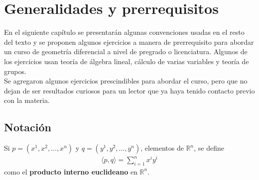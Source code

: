 \documentclass[oneside,11pt]{memoir}
\begin{document}
\chapter*{Generalidades y prerrequisitos}

En el siguiente capítulo se presentarán algunas convenciones usadas en el resto del texto y se proponen algunos ejercicios a manera de prerrequisito para abordar un curso de geometría diferencial a nivel de pregrado o licenciatura. Algunos de los ejercicios usan teoría de álgebra lineal, cálculo de varias variables y teoría de grupos.
\\
Se agregaron algunos ejercicios prescindibles para abordar el curso, pero que no dejan de ser resultados curiosos para un lector que ya haya tenido contacto previo con la materia.



\section{Notación}
\begin{definition}
Si $p=(x^1,x^2,...,x^n)$ y $q=(y^1,y^2,...,y^n)$, elementos de $\mathbb{R}^n$, se define
\begin{align*}
    \langle p,q \rangle =\sum_{i=1}^nx^iy^i
\end{align*}
como el \textbf{producto interno euclideano} en $\mathbb{R}^n$.
\end{definition}
\end{document}
